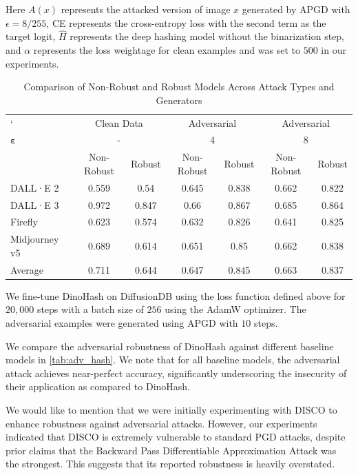 {Here $A(x)$ represents the attacked version of image $x$ generated by APGD with $\epsilon=8/255$, CE represents the cross-entropy loss with the second term as the target logit, $\hat{H}$ represents the deep hashing model without the binarization step, and $\alpha$ represents the loss weightage for clean examples and was set to $500$ in our experiments. 
\begin{table}[htbp]
    \centering
    \begin{tabular}{l c c c c c c}
        \toprule
       ` & \multicolumn{2}{c}{Clean Data} & \multicolumn{2}{c}{Adversarial} & \multicolumn{2}{c}{Adversarial} \\
        \cmidrule(lr){2-3} \cmidrule(lr){4-5} \cmidrule(lr){6-7}
        $\boldsymbol{\varepsilon}$
 & \multicolumn{2}{c}{-} & \multicolumn{2}{c}{4} & \multicolumn{2}{c}{8} \\
        \midrule
        & Non-Robust & Robust & Non-Robust & Robust & Non-Robust & Robust \\
        \midrule
        DALL·E 2 & 0.559 & 0.54 & 0.645 & 0.838 & 0.662 & 0.822 \\
        DALL·E 3 & 0.972 & 0.847 & 0.66 & 0.867 & 0.685 & 0.864 \\
        Firefly & 0.623 & 0.574 & 0.632 & 0.826 & 0.641 & 0.825 \\
        Midjourney v5 & 0.689 & 0.614 & 0.651 & 0.85 & 0.662 & 0.838 \\
        Average & 0.711 & 0.644 & 0.647 & 0.845 & 0.663 & 0.837 \\
        \bottomrule
    \end{tabular}
    \caption{Comparison of Non-Robust and Robust Models Across Attack Types and Generators}
    \label{tab:robust_dldetector}
\end{table}
We fine-tune DinoHash on DiffusionDB using the loss function defined above for $20,000$ steps with a batch size of $256$ using the AdamW optimizer. The adversarial examples were generated using APGD with $10$ steps.

We compare the adversarial robustness of DinoHash against different baseline models in \autoref{tab:adv_hash}. We note that for all baseline models, the adversarial attack achieves near-perfect accuracy, significantly underscoring the insecurity of their application as compared to DinoHash. 

We would like to mention that we were initially experimenting with DISCO  to enhance robustness against adversarial attacks. However, our experiments indicated that DISCO is extremely vulnerable to standard PGD attacks, despite prior claims that the Backward Pass Differentiable Approximation Attack  was the strongest. This suggests that its reported robustness is heavily overstated.

}
